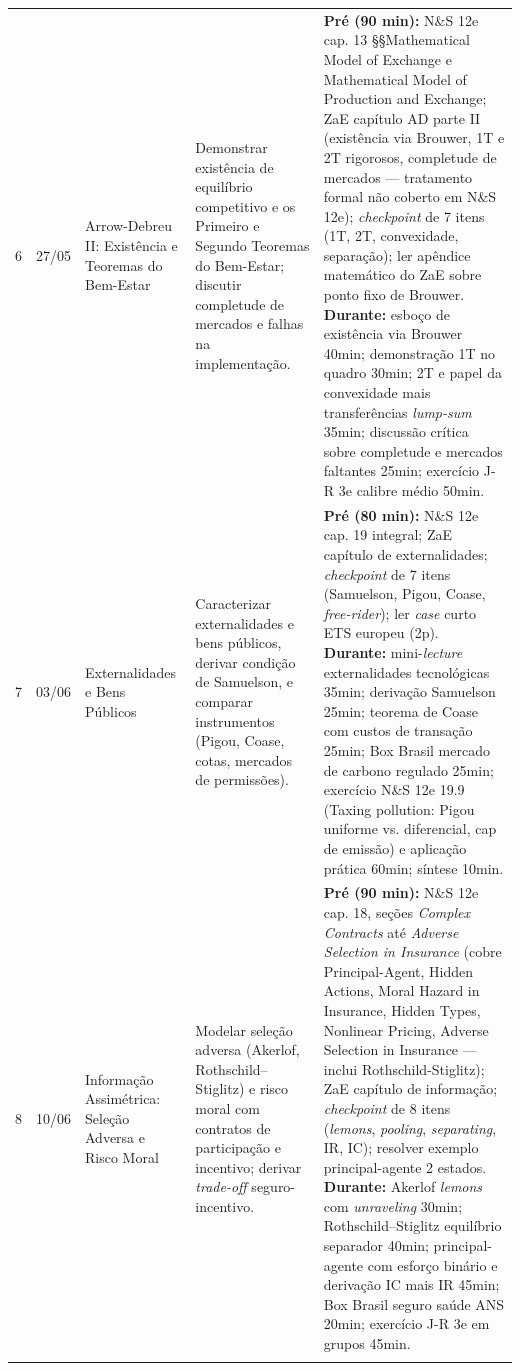\documentclass[11pt,a4paper]{article}
\newcommand{\zaeshort}{ZaE}
\newcommand{\ns}{N\&S 12e}
\newcommand{\jr}{J-R 3e}
\begin{document}
\begin{small}
\begin{longtable}{@{}p{0.9cm}p{1.6cm}p{2.8cm}p{4.2cm}p{4.6cm}@{}}
6 & 27/05 & Arrow-Debreu II: Existência e Teoremas do Bem-Estar & Demonstrar existência de equilíbrio competitivo e os Primeiro e Segundo Teoremas do Bem-Estar; discutir completude de mercados e falhas na implementação. &
\textbf{Pré (90 min):} \ns{} cap. 13 §§Mathematical Model of Exchange e Mathematical Model of Production and Exchange; \zaeshort{} capítulo AD parte II (existência via Brouwer, 1T e 2T rigorosos, completude de mercados --- tratamento formal não coberto em \ns{}); \textit{checkpoint} de 7 itens (1T, 2T, convexidade, separação); ler apêndice matemático do \zaeshort{} sobre ponto fixo de Brouwer.\newline
\textbf{Durante:} esboço de existência via Brouwer 40min; demonstração 1T no quadro 30min; 2T e papel da convexidade mais transferências \textit{lump-sum} 35min; discussão crítica sobre completude e mercados faltantes 25min; exercício \jr{} calibre médio 50min. \\
\addlinespace

7 & 03/06 & Externalidades e Bens Públicos & Caracterizar externalidades e bens públicos, derivar condição de Samuelson, e comparar instrumentos (Pigou, Coase, cotas, mercados de permissões). &
\textbf{Pré (80 min):} \ns{} cap. 19 integral; \zaeshort{} capítulo de externalidades; \textit{checkpoint} de 7 itens (Samuelson, Pigou, Coase, \textit{free-rider}); ler \textit{case} curto ETS europeu (2p).\newline
\textbf{Durante:} mini-\textit{lecture} externalidades tecnológicas 35min; derivação Samuelson 25min; teorema de Coase com custos de transação 25min; Box Brasil mercado de carbono regulado 25min; exercício \ns{} 19.9 (Taxing pollution: Pigou uniforme vs. diferencial, cap de emissão) e aplicação prática 60min; síntese 10min. \\
\addlinespace

8 & 10/06 & Informação Assimétrica: Seleção Adversa e Risco Moral & Modelar seleção adversa (Akerlof, Rothschild--Stiglitz) e risco moral com contratos de participação e incentivo; derivar \textit{trade-off} seguro-incentivo. &
\textbf{Pré (90 min):} \ns{} cap. 18, seções \textit{Complex Contracts} até \textit{Adverse Selection in Insurance} (cobre Principal-Agent, Hidden Actions, Moral Hazard in Insurance, Hidden Types, Nonlinear Pricing, Adverse Selection in Insurance --- inclui Rothschild-Stiglitz); \zaeshort{} capítulo de informação; \textit{checkpoint} de 8 itens (\textit{lemons}, \textit{pooling}, \textit{separating}, IR, IC); resolver exemplo principal-agente 2 estados.\newline
\textbf{Durante:} Akerlof \textit{lemons} com \textit{unraveling} 30min; Rothschild--Stiglitz equilíbrio separador 40min; principal-agente com esforço binário e derivação IC mais IR 45min; Box Brasil seguro saúde ANS 20min; exercício \jr{} em grupos 45min. \\
\addlinespace


\end{longtable}
\end{small}
\end{document}
